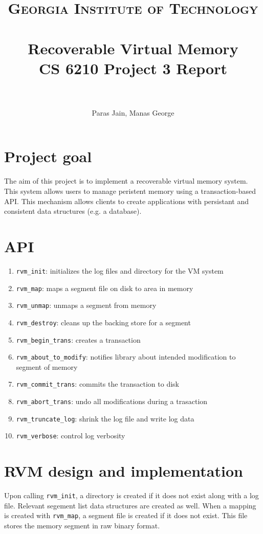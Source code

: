 \documentclass[paper=a4,fontsize=11pt]{report} %
\title{	
\normalfont \normalsize 
\textsc{Georgia Institute of Technology} \\ [25pt] %
\horrule{0.5pt} \\[0.4cm] %
\Huge Recoverable Virtual Memory \\ \huge CS 6210 Project 3 Report\\ %
\horrule{2pt} \\[0.5cm] %
}
\author{Paras Jain, Manas George}
\date{}
\numberwithin{equation}{section} %
\numberwithin{figure}{section} %
\numberwithin{table}{section} %
\begin{document}
\maketitle %

\section{Project goal}
The aim of this project is to implement a recoverable virtual memory system. This system allows users to manage peristent memory using a transaction-based API. This mechanism allows clients to create applications with persistant and consistent data structures (e.g. a database).

\section{API}

\begin{enumerate}
  \item \texttt{rvm\_init}: initializes the log files and directory for the VM system
  \item \texttt{rvm\_map}: maps a segment file on disk to area in memory
  \item \texttt{rvm\_unmap}: unmaps a segment from memory
  \item \texttt{rvm\_destroy}: cleans up the backing store for a segment
  \item \texttt{rvm\_begin\_trans}: creates a transaction
  \item \texttt{rvm\_about\_to\_modify}: notifies library about intended modification to segment of memory
  \item \texttt{rvm\_commit\_trans}: commits the transaction to disk
  \item \texttt{rvm\_abort\_trans}: undo all modifications during a trasaction
  \item \texttt{rvm\_truncate\_log}: shrink the log file and write log data
  \item \texttt{rvm\_verbose}: control log verbosity
\end{enumerate}

\section{RVM design and implementation}
Upon calling \texttt{rvm\_init}, a directory is created if it does not exist along with a log file. Relevant segement list data structures are created as well. When a mapping is created with \texttt{rvm_map}, a segment file is created if it does not exist. This file stores the memory segment in raw binary format.
\end{document}
